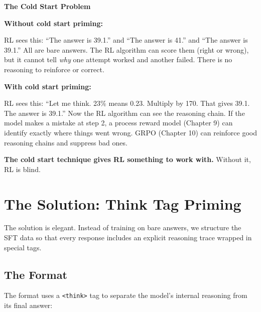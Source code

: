 \begin{chapterenv}
\begin{infobox}
\textbf{The Cold Start Problem}

\textbf{Without cold start priming:}

RL sees this: ``The answer is 39.1.'' and ``The answer is 41.'' and ``The answer is 39.1.'' All are bare answers. The RL algorithm can score them (right or wrong), but it cannot tell \textit{why} one attempt worked and another failed. There is no reasoning to reinforce or correct.

\textbf{With cold start priming:}

RL sees this: ``Let me think. 23\% means 0.23. Multiply by 170. That gives 39.1. The answer is 39.1.'' Now the RL algorithm can see the reasoning chain. If the model makes a mistake at step 2, a process reward model (Chapter 9) can identify exactly where things went wrong. GRPO (Chapter 10) can reinforce good reasoning chains and suppress bad ones.

\textbf{The cold start technique gives RL something to work with.} Without it, RL is blind.
\end{infobox}

\section{The Solution: Think Tag Priming}

The solution is elegant. Instead of training on bare answers, we structure the SFT data so that every response includes an explicit reasoning trace wrapped in special tags.

\subsection{The Format}

The format uses a \texttt{<think>} tag to separate the model's internal reasoning from its final answer:



\end{chapterenv}
